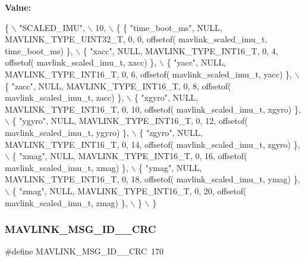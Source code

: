 {\bfseries Value\+:}
\begin{DoxyCode}
\{ \(\backslash\)
    \textcolor{stringliteral}{"SCALED\_IMU"}, \(\backslash\)
    10, \(\backslash\)
    \{  \{ \textcolor{stringliteral}{"time\_boot\_ms"}, NULL, MAVLINK_TYPE_UINT32_T, 0, 0, offsetof(
      mavlink_scaled_imu_t, time\_boot\_ms) \}, \(\backslash\)
         \{ \textcolor{stringliteral}{"xacc"}, NULL, MAVLINK_TYPE_INT16_T, 0, 4, offsetof(
      mavlink_scaled_imu_t, xacc) \}, \(\backslash\)
         \{ \textcolor{stringliteral}{"yacc"}, NULL, MAVLINK_TYPE_INT16_T, 0, 6, offsetof(
      mavlink_scaled_imu_t, yacc) \}, \(\backslash\)
         \{ \textcolor{stringliteral}{"zacc"}, NULL, MAVLINK_TYPE_INT16_T, 0, 8, offsetof(
      mavlink_scaled_imu_t, zacc) \}, \(\backslash\)
         \{ \textcolor{stringliteral}{"xgyro"}, NULL, MAVLINK_TYPE_INT16_T, 0, 10, offsetof(
      mavlink_scaled_imu_t, xgyro) \}, \(\backslash\)
         \{ \textcolor{stringliteral}{"ygyro"}, NULL, MAVLINK_TYPE_INT16_T, 0, 12, offsetof(
      mavlink_scaled_imu_t, ygyro) \}, \(\backslash\)
         \{ \textcolor{stringliteral}{"zgyro"}, NULL, MAVLINK_TYPE_INT16_T, 0, 14, offsetof(
      mavlink_scaled_imu_t, zgyro) \}, \(\backslash\)
         \{ \textcolor{stringliteral}{"xmag"}, NULL, MAVLINK_TYPE_INT16_T, 0, 16, offsetof(
      mavlink_scaled_imu_t, xmag) \}, \(\backslash\)
         \{ \textcolor{stringliteral}{"ymag"}, NULL, MAVLINK_TYPE_INT16_T, 0, 18, offsetof(
      mavlink_scaled_imu_t, ymag) \}, \(\backslash\)
         \{ \textcolor{stringliteral}{"zmag"}, NULL, MAVLINK_TYPE_INT16_T, 0, 20, offsetof(
      mavlink_scaled_imu_t, zmag) \}, \(\backslash\)
         \} \(\backslash\)
\}
\end{DoxyCode}
\mbox{\label{mavlink__msg__scaled__imu_8h_a1091fd68caff1d465e5d48816d7fe32a}} 
\subsubsection{M\+A\+V\+L\+I\+N\+K\+\_\+\+M\+S\+G\+\_\+\+I\+D\+\_\+\_\+\+C\+RC}
{\footnotesize\ttfamily \#define M\+A\+V\+L\+I\+N\+K\+\_\+\+M\+S\+G\+\_\+\+I\+D\+\_\+\_\+\+C\+RC~170}

